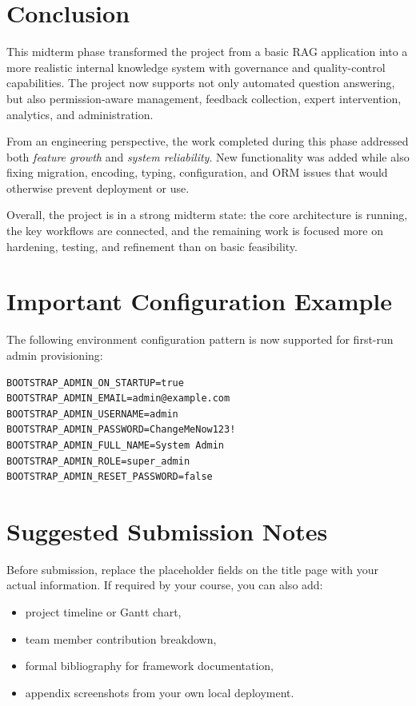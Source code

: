 \documentclass[12pt,a4paper]{report}
\begin{document}
\chapter{Conclusion}

This midterm phase transformed the project from a basic RAG application into a more realistic internal knowledge system with governance and quality-control capabilities. The project now supports not only automated question answering, but also permission-aware management, feedback collection, expert intervention, analytics, and administration.

From an engineering perspective, the work completed during this phase addressed both \textit{feature growth} and \textit{system reliability}. New functionality was added while also fixing migration, encoding, typing, configuration, and ORM issues that would otherwise prevent deployment or use.

Overall, the project is in a strong midterm state: the core architecture is running, the key workflows are connected, and the remaining work is focused more on hardening, testing, and refinement than on basic feasibility.

\appendix

\chapter{Important Configuration Example}

The following environment configuration pattern is now supported for first-run admin provisioning:

\begin{lstlisting}[style=projectstyle]
BOOTSTRAP_ADMIN_ON_STARTUP=true
BOOTSTRAP_ADMIN_EMAIL=admin@example.com
BOOTSTRAP_ADMIN_USERNAME=admin
BOOTSTRAP_ADMIN_PASSWORD=ChangeMeNow123!
BOOTSTRAP_ADMIN_FULL_NAME=System Admin
BOOTSTRAP_ADMIN_ROLE=super_admin
BOOTSTRAP_ADMIN_RESET_PASSWORD=false
\end{lstlisting}

\chapter{Suggested Submission Notes}

Before submission, replace the placeholder fields on the title page with your actual information. If required by your course, you can also add:
\begin{itemize}[leftmargin=1.5em]
\item project timeline or Gantt chart,
\item team member contribution breakdown,
\item formal bibliography for framework documentation,
\item appendix screenshots from your own local deployment.
\end{itemize}
\end{document}
